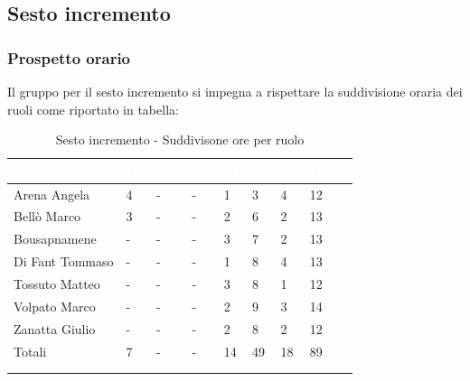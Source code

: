     \subsection{Sesto incremento} 
    {
    \subsubsection{Prospetto orario}
    {
    Il gruppo per il sesto incremento si impegna a rispettare la suddivisione oraria dei ruoli come riportato in tabella:
      \setlength{\freewidth}{\dimexpr\textwidth-30\tabcolsep}
      \renewcommand{\arraystretch}{1.0}
      \setlength{\aboverulesep}{0pt}
      \setlength{\belowrulesep}{0pt}
      \begin{longtable}{C{.4\freewidth} C{.1\freewidth} C{.1\freewidth} C{.1\freewidth} C{.1\freewidth} C{.1\freewidth} C{.1\freewidth} C{.1\freewidth} C{.1\freewidth}}
      \toprule
      \textcolor{white}{\textbf{Componente}}&
      \textcolor{white}{\textbf{Re}}&
      \textcolor{white}{\textbf{Am}}&
      \textcolor{white}{\textbf{An}}&
      \textcolor{white}{\textbf{Pt}}&
      \textcolor{white}{\textbf{Pr}}&
      \textcolor{white}{\textbf{Ve}}&
      \textcolor{white}{\textbf{Ore}}\\
      \toprule
      \endhead

      Arena Angela & 4 & - & -  & 1 & 3 & 4 & 12 \\      
      Bellò Marco & 3 & - & - & 2 & 6 & 2 & 13 \\      
      Bousapnamene & - & - & - & 3 & 7 & 2 & 13 \\      
      Di Fant Tommaso & - & - & - & 1 & 8 & 4 & 13 \\      
      Tossuto Matteo & - & - & - & 3 & 8 & 1 & 12 \\      
      Volpato Marco & - & - & - & 2 & 9 & 3 & 14 \\      
      Zanatta Giulio & - & - & - & 2 & 8 & 2 & 12 \\      
      Totali & 7 & - & - & 14 & 49 & 18 & 89 \\
      \bottomrule
      \\
      \caption{Sesto incremento - Suddivisone ore per ruolo}

      \end{longtable} 

}}
